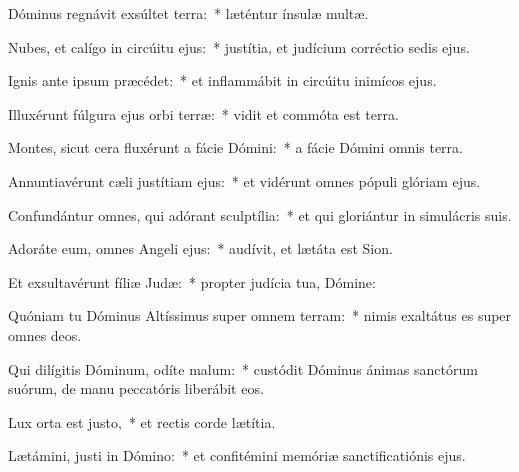 \item Dóminus regnávit exsúltet terra:~* læténtur ínsulæ multæ.

\item Nubes, et calígo in circúitu ejus:~* justítia, et judícium corréctio sedis ejus.

\item Ignis ante ipsum præcédet:~* et inflammábit in circúitu inimícos ejus.

\item Illuxérunt fúlgura ejus orbi terræ:~* vidit et commóta est terra.

\item Montes, sicut cera fluxérunt a fácie Dómini:~* a fácie Dómini omnis terra.

\item Annuntiavérunt cæli justítiam ejus:~* et vidérunt omnes pópuli glóriam ejus.

\item Confundántur omnes, qui adórant sculptília:~* et qui gloriántur in simulácris suis.

\item Adoráte eum, omnes Angeli ejus:~* audívit, et lætáta est Sion.

\item Et exsultavérunt fíliæ Judæ:~* propter judícia tua, Dómine:

\item Quóniam tu Dóminus Altíssimus super omnem terram:~* nimis exaltátus es super omnes deos.

\item Qui dilígitis Dóminum, odíte malum:~* custódit Dóminus ánimas sanctórum suórum, de manu peccatóris liberábit eos.

\item Lux orta est justo,~* et rectis corde lætítia.

\item Lætámini, justi in Dómino:~* et confitémini memóriæ sanctificatiónis ejus.
